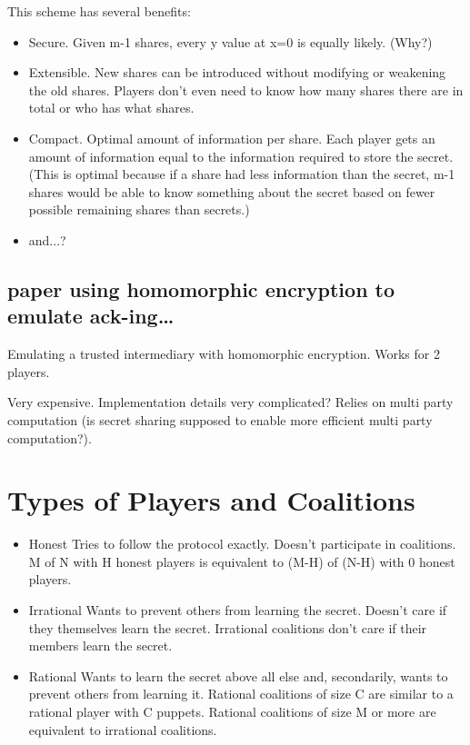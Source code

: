 \documentclass{article}
\begin{document}
This scheme has several benefits:
\begin{itemize}
	\item Secure. Given m-1 shares, every y value at x=0 is equally likely. (Why?)
	\item Extensible. New shares can be introduced without modifying or weakening the old shares. Players don't even need to know how many shares there are in total or who has what shares.
	\item Compact. Optimal amount of information per share. Each player gets an amount of information equal to the information required to store the secret. (This is optimal because if a share had less information than the secret, m-1 shares would be able to know something about the secret based on fewer possible remaining shares than secrets.)
	\item and...?
\end{itemize}

\subsection{paper using homomorphic encryption to emulate ack-ing\ldots}
Emulating a trusted intermediary with homomorphic encryption. Works for 2 players.

Very expensive. Implementation details very complicated? Relies on multi party computation (is secret sharing supposed to enable more efficient multi party computation?).

\section{Types of Players and Coalitions}

\begin{itemize}
  \item Honest
  \subitem Tries to follow the protocol exactly.
  \subitem Doesn't participate in coalitions.
  \subitem M of N with H honest players is equivalent to (M-H) of (N-H) with 0 honest players.
  \item Irrational
  \subitem Wants to prevent others from learning the secret. Doesn't care if they themselves learn the secret.
  \subitem Irrational coalitions don't care if their members learn the secret.
  \item Rational
  \subitem Wants to learn the secret above all else and, secondarily, wants to prevent others from learning it.
  \subitem Rational coalitions of size C are similar to a rational player with C puppets.
  \subitem Rational coalitions of size M or more are equivalent to irrational coalitions. 
\end{itemize}
\end{document}
